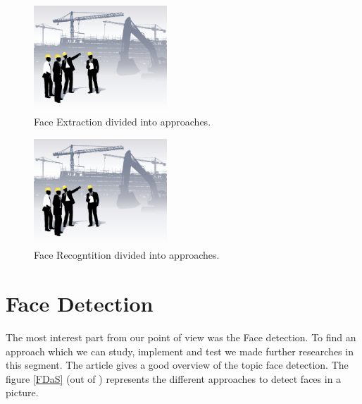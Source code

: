 \documentclass[Bachelorarbeit.tex]{subfiles}
\begin{document}
\begin{figure}[!h] %
\centering
\includegraphics[width=5cm]{./pictures/UnderConstruction}
\caption{Face Extraction divided into approaches. \label{FEa}}
\end{figure}

\begin{figure}[!h] %
\centering
\includegraphics[width=5cm]{./pictures/UnderConstruction}
\caption{Face Recogntition divided into approaches. \label{FRa}}
\end{figure}

\section{Face Detection}
The most interest part from our point of view was the Face detection. To find an approach which we can study, implement and test we made further researches in this segment. The article \cite{FDASurvey} gives a good overview of the topic face detection. The figure \ref{FDaS} (out of \cite{FDASurvey}) represents the different approaches to detect faces in a picture.
\end{document}
